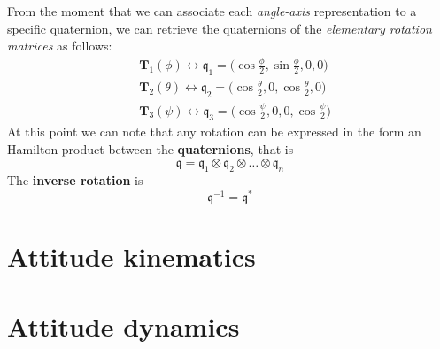 \noindent
From the moment that we can associate each \textit{angle-axis} representation to a specific quaternion, we can retrieve the quaternions of the \textit{elementary rotation matrices} as follows:
{\Large{
    \begin{align*}
        &\mathbf{T}_1(\phi) \longleftrightarrow
        \mathfrak{q}_1 = \bigg(\cos \frac{\phi}{2}, \sin \frac{\phi}{2}, 0, 0 \bigg)\\
        &\mathbf{T}_2(\theta) \longleftrightarrow 
        \mathfrak{q}_2=\bigg(\cos \frac{\theta}{2}, 0, \cos \frac{\theta}{2}, 0 \bigg)\\
        &\mathbf{T}_3(\psi) \longleftrightarrow 
        \mathfrak{q}_3=\bigg(\cos \frac{\psi}{2}, 0, 0, \cos\frac{\psi}{2} \bigg)
    \end{align*}
}}
At this point we can note that any rotation can be expressed in the form an Hamilton product between the \textbf{quaternions}, that is 
{\Large{
    \begin{equation*}
        \mathfrak{q} = 
        \mathfrak{q}_1 \otimes
        \mathfrak{q}_2 \otimes
        \dots \otimes
        \mathfrak{q}_n
    \end{equation*}
}}
The \textbf{inverse rotation} is
{\Large{
    \begin{equation*}
        \mathfrak{q}^{-1} = \mathfrak{q}^*
    \end{equation*}
}}

\section{Attitude kinematics}

\section{Attitude dynamics}

